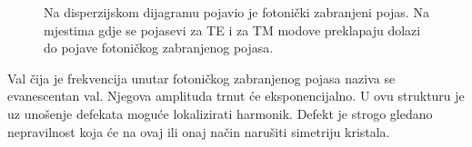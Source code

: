 \documentclass[utf8, seminar, numeric]{fer}
\begin{document}
\begin{figure}[ht]
\centering
    \qquad
	\caption{Na disperzijskom dijagramu pojavio je fotonički zabranjeni pojas. Na mjestima
	gdje se pojasevi za TE i za TM modove preklapaju dolazi do pojave fotoničkog
	zabranjenog pojasa.}
	\label{fig:triangular_lattice_holes}
\end{figure}

\FloatBarrier

Val čija je frekvencija unutar fotoničkog zabranjenog pojasa naziva se
evanescentan val.
Njegova amplituda trnut će eksponencijalno. U ovu strukturu je uz unošenje
defekata moguće lokalizirati harmonik. Defekt je strogo gledano nepravilnost
koja će na ovaj ili onaj način narušiti simetriju kristala.
\end{document}
